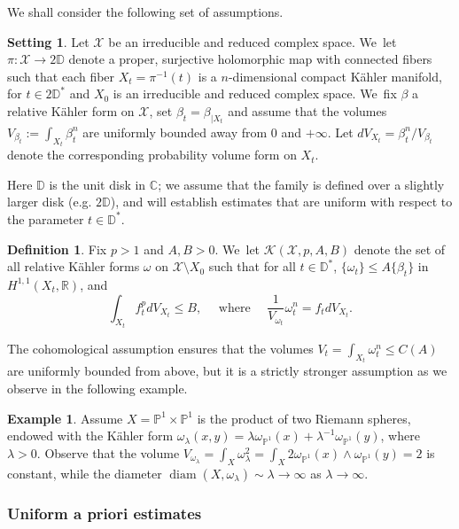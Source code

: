 \documentclass[11pt]{article}
\numberwithin{equation}{section}
\DeclareMathOperator{\diam}{diam}
\theoremstyle{definition}
\newtheorem{setting}[theorem]{Setting}
\newtheorem{defi}[theorem]{Definition}
\newtheorem{exa}[theorem]{Example}
\newcommand{\C}{\mathbb C}
\newcommand{\PP}{\mathbb P}
\newcommand{\R}{\mathbb R}
\begin{document}
We shall consider the following set of assumptions.

\begin{setting} \label{set}
Let $\mathcal{X}$ be an irreducible and reduced complex space. We~let $\pi:{\mathcal X} \rightarrow 2 \mathbb D$
denote a proper, surjective holomorphic map with connected fibers such that each fiber $X_t=\pi^{-1}(t)$ is a $n$-dimensional
compact Kähler manifold, for $t\in 2 \mathbb D^*$ and $X_0$ is an irreducible and reduced complex space. We~fix $\beta$ a relative Kähler form on $\mathcal{X}$, set $\beta_t=\beta_{|X_t}$ and assume that the volumes $V_{\beta_t}:=\int_{X_t} \beta_t^n$ are uniformly bounded away from 0 and $+ \infty $. Let $dV_{X_t}=\beta_t^n /V_{\beta_t}$ denote the corresponding probability volume form on $X_t$.
\end{setting}

Here $\mathbb D$ is the unit disk in $\C$; we assume that the family is defined over a slightly larger disk
(e.g. $2 \mathbb D$), and will establish estimates that are uniform with respect to the parameter $t \in \mathbb D^*$.

\begin{defi}
Fix $p>1$ and $A,B>0$. We~let ${\mathcal K}(\mathcal{X},p,A,B)$ denote the set of all relative Kähler forms $\omega$ on
$\mathcal{X}\setminus X_0$ such that for all $t \in \mathbb D^*$, $\{\omega_t\}\leq A\{\beta_t\}$ in $H^{1,1}(X_t,\R)$, and
\[
\int_{X_t} f_t^p dV_{X_t} \leq B,
\quad \text{ where } \quad
\frac{1}{V_{\omega_t}} \omega_t^n=f_t dV_{X_t}.
\]
\end{defi}

The cohomological assumption
ensures that the volumes $V_t=\int_{X_t} \omega_t^n \leq C(A)$ are uniformly bounded from above,
but it is a strictly stronger assumption as we observe in the following example.

\begin{exa} \label{exa:voldiam}
Assume ${X}=\PP^1 \times \PP^1$ is the product of two Riemann spheres, endowed with the
Kähler form $\omega_{\lambda}(x,y)=\lambda \omega_{\PP^1}(x)+\lambda^{-1} \omega_{\PP^1}(y)$,
where $\lambda>0$. Observe that the volume
$
V_{\omega_{\lambda}}=\int_X \omega_{\lambda}^2=\int_X 2 \omega_{\PP^1}(x) \wedge \omega_{\PP^1}(y)=2
$
is constant, while the diameter
$\diam(X,\omega_{\lambda}) \sim \lambda \rightarrow \infty$ as $\lambda \rightarrow \infty$.
\end{exa}

\subsubsection{Uniform a priori estimates}
\end{document}
